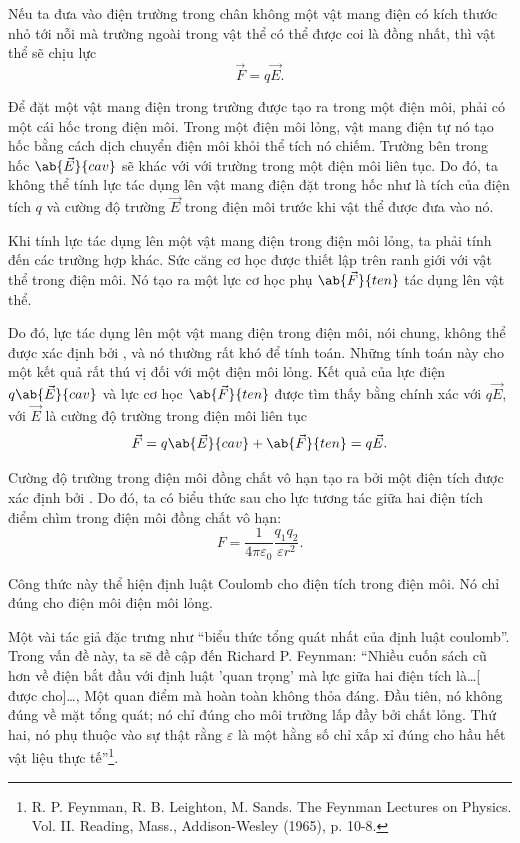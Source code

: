 Nếu ta đưa vào điện trường trong chân không một vật mang điện có kích thước nhỏ tới nỗi mà trường ngoài trong vật thể có thể được coi là đồng nhất, thì vật thể sẽ chịu lực
\begin{equation}\label{eq:2_50}
    \vec{F} = q \vec{E}.
\end{equation}

\noindent
Để đặt một vật mang điện trong trường được tạo ra trong một điện môi, phải có một cái hốc trong điện môi. Trong một điện môi lỏng, vật mang điện tự nó tạo hốc bằng cách dịch chuyển điện môi khỏi thể tích nó chiếm. Trường bên trong hốc $\ab{\vec{E}}{cav}$ sẽ khác với với trường trong một điện môi liên tục. Do đó, ta không thể tính lực tác dụng lên vật mang điện đặt trong hốc như là tích của điện tích $q$ và cường độ trường $\vec{E}$ trong điện môi trước khi vật thể được đưa vào nó.

Khi tính lực tác dụng lên một vật mang điện trong điện môi lỏng, ta phải tính đến các trường hợp khác. Sức căng cơ học được thiết lập trên ranh giới với vật thể trong điện môi. Nó tạo ra một lực cơ học phụ $\ab{\vec{F}}{ten}$ tác dụng lên vật thể.

Do đó, lực tác dụng lên một vật mang điện trong điện môi, nói chung, không thể được xác định bởi , và nó thường rất khó để tính toán. Những tính toán này cho một kết quả rất thú vị đối với một điện môi lỏng. Kết quả của lực điện $q\ab{\vec{E}}{cav}$ và lực cơ học $\ab{\vec{F}}{ten}$ được tìm thấy bằng chính xác với $q\vec{E}$, với $\vec{E}$ là cường độ trường trong điện môi liên tục
\begin{equation}\label{eq:2_51}
    \vec{F} = q\ab{\vec{E}}{cav} + \ab{\vec{F}}{ten} = q\vec{E}.
\end{equation}

Cường độ trường trong điện môi đồng chất vô hạn tạo ra bởi một điện tích được xác định bởi . Do đó, ta có biểu thức sau cho lực tương tác giữa hai điện tích điểm chìm trong điện môi đồng chất vô hạn:
\begin{equation}\label{eq:2_52}
    F = \frac{1}{4\pi\varepsilon_0} \frac{q_1q_2}{\varepsilon r^2}.
\end{equation}

\noindent
Công thức này thể hiện định luật Coulomb cho điện tích trong điện môi. Nó chỉ đúng cho điện môi điện môi lỏng.

Một vài tác giả đặc trưng  như ``biểu thức tổng quát nhất của định luật coulomb''. Trong vấn đề này, ta sẽ đề cập đến Richard P. Feynman: ``Nhiều cuốn sách cũ hơn về điện bắt đầu với định luật 'quan trọng' mà lực giữa hai điện tích là\ldots [ được cho]\ldots, Một quan điểm mà hoàn toàn không thỏa đáng. Đầu tiên, nó không đúng về mặt tổng quát; nó chỉ đúng cho môi trường lấp đầy bởi chất lỏng. Thứ hai, nó phụ thuộc vào sự thật rằng $\varepsilon$ là một hằng số chỉ xấp xỉ đúng cho hầu hết vật liệu thực tế''\footnote{R. P. Feynman, R. B. Leighton, M. Sands. The Feynman Lectures on Physics. Vol. II. Reading, Mass., Addison-Wesley (1965), p. 10-8.}.

